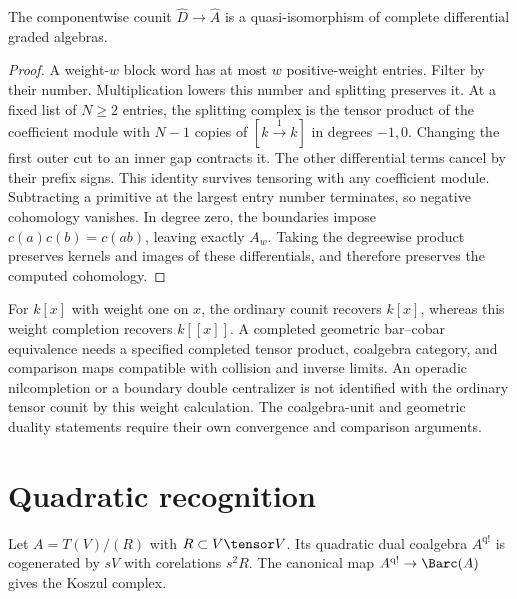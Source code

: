 \begin{theorem}
The componentwise counit $\widehat D\to\widehat A$ is a quasi-isomorphism
of complete differential graded algebras.
\end{theorem}
\begin{proof}
A weight-$w$ block word has at most $w$ positive-weight entries.
Filter by their number. Multiplication lowers this number and splitting preserves it.
At a fixed list of $N\ge2$ entries, the splitting complex is the tensor product
of the coefficient module with $N-1$ copies of $[k\xrightarrow{1}k]$ in degrees $-1,0$.
Changing the first outer cut to an inner gap contracts it.
The other differential terms cancel by their prefix signs.
This identity survives tensoring with any coefficient module.
Subtracting a primitive at the largest entry number terminates, so negative cohomology vanishes.
In degree zero, the boundaries impose $c(a)c(b)=c(ab)$,
leaving exactly $A_w$.
Taking the degreewise product preserves kernels and images of these differentials,
and therefore preserves the computed cohomology.
\end{proof}

For $k[x]$ with weight one on $x$, the ordinary counit recovers $k[x]$,
whereas this weight completion recovers $k[[x]]$.
A completed geometric bar--cobar equivalence needs a specified completed tensor product,
coalgebra category, and comparison maps compatible with collision and inverse limits.
An operadic nilcompletion or a boundary double centralizer is not identified
with the ordinary tensor counit by this weight calculation.
The coalgebra-unit and geometric duality statements require their own convergence and comparison arguments.

\section{Quadratic recognition}
Let $A=T(V)/(R)$ with $R\subset V\tensor V$. Its quadratic dual coalgebra $A^{\mathrm{q!}}$ is cogenerated by $sV$ with corelations $s^2R$. The canonical map $A^{\mathrm{q!}}\to\Barc(A)$ gives the Koszul complex.

